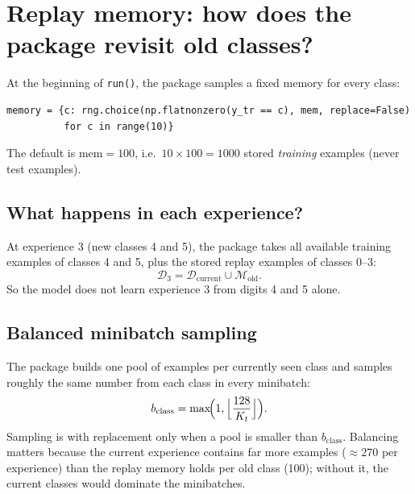 \documentclass[11pt,a4paper]{article}
\newcommand{\code}[1]{\texttt{#1}}
\begin{document}
\section{Replay memory: how does the package revisit old classes?}

At the beginning of \code{run()}, the package samples a fixed memory for every class:
\begin{lstlisting}
memory = {c: rng.choice(np.flatnonzero(y_tr == c), mem, replace=False)
          for c in range(10)}
\end{lstlisting}
The default is $\text{mem}=100$, i.e.\ $10\times100=1000$ stored \emph{training} examples (never test examples).

\subsection{What happens in each experience?}

At experience 3 (new classes 4 and 5), the package takes all available training examples of classes 4 and 5, plus the stored replay examples of classes 0--3:
\[
\mathcal D_3=\mathcal D_{\text{current}}\cup\mathcal M_{\text{old}}.
\]
So the model does not learn experience 3 from digits 4 and 5 alone.

\subsection{Balanced minibatch sampling}

The package builds one pool of examples per currently seen class and samples roughly the same number from each class in every minibatch:
\[
b_{\text{class}}=\max\!\Bigl(1,\Bigl\lfloor\frac{128}{K_t}\Bigr\rfloor\Bigr).
\]
Sampling is with replacement only when a pool is smaller than $b_{\text{class}}$. Balancing matters because the current experience contains far more examples ($\approx 270$ per experience) than the replay memory holds per old class (100); without it, the current classes would dominate the minibatches.
\end{document}
